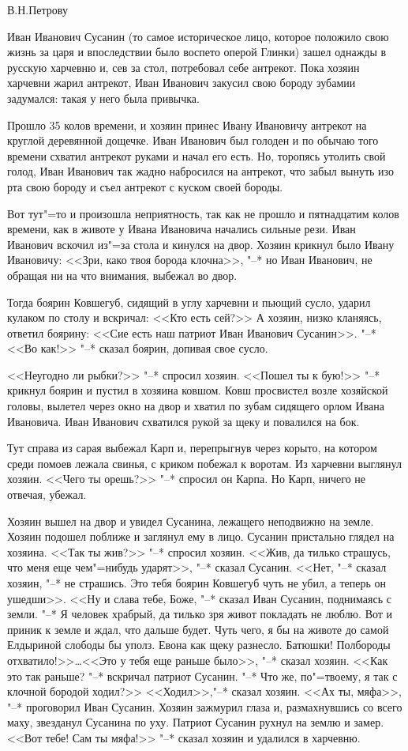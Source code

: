 \begin{flushright}
В.Н.Петрову
\end{flushright}

Иван Иванович Сусанин (то самое историческое лицо, которое положило свою жизнь за царя и впоследствии было воспето оперой Глинки) зашел однажды в русскую харчевню и, сев за стол, потребовал себе антрекот. Пока хозяин харчевни жарил антрекот, Иван Иванович закусил свою бороду зубамии задумался: такая у него была привычка. 

Прошло 35 колов времени, и хозяин принес Ивану Ивановичу антрекот на круглой деревянной дощечке. Иван Иванович был голоден и по обычаю того времени схватил антрекот руками и начал его есть. Но, торопясь утолить свой голод, Иван Иванович так жадно набросился на антрекот, что забыл вынуть изо рта свою бороду и съел антрекот с куском своей бороды. 

Вот тут"=то и произошла неприятность, так как не прошло и пятнадцатим колов времени, как в животе у Ивана Ивановича начались сильные рези. Иван Иванович вскочил из"=за стола и кинулся на двор. Хозяин крикнул было Ивану Ивановичу: <<Зри, како твоя борода клочна>>, "--* но Иван Иванович, не обращая ни на что внимания, выбежал во двор. 

Тогда боярин Ковшегуб, сидящий в углу харчевни и пьющий сусло, ударил кулаком по столу и вскричал: <<Кто есть сей?>> А хозяин, низко кланяясь, ответил боярину: <<Сие есть наш патриот Иван Иванович Сусанин>>. "--* <<Во как!>> "--* сказал боярин, допивая свое сусло. 

<<Неугодно ли рыбки?>> "--* спросил хозяин. <<Пошел ты к бую!>> "--* крикнул боярин и пустил в хозяина ковшом. Ковш просвистел возле хозяйской головы, вылетел через окно на двор и хватил по зубам сидящего орлом Ивана Ивановича. Иван Иванович схватился рукой за щеку и повалился на бок. 

Тут справа из сарая выбежал Карп и, перепрыгнув через корыто, на котором среди помоев лежала свинья, с криком побежал к воротам. Из харчевни выглянул хозяин. <<Чего ты орешь?>> "--* спросил он Карпа. Но Карп, ничего не отвечая, убежал. 

Хозяин вышел на двор и увидел Сусанина, лежащего неподвижно на земле. Хозяин подошел поближе и заглянул ему в лицо. Сусанин пристально глядел на хозяина. <<Так ты жив?>> "--* спросил хозяин. <<Жив, да тилько страшусь, что меня еще чем"=нибудь ударят>>, "--* сказал Сусанин. <<Нет, "--* сказал хозяин, "--* не страшись. Это тебя боярин Ковшегуб чуть не убил, а теперь он ушедши>>. <<Ну и слава тебе, Боже, "--* сказал Иван Сусанин, поднимаясь с земли. "--* Я человек храбрый, да тилько зря живот покладать не люблю. Вот и приник к земле и ждал, что дальше будет. Чуть чего, я бы на животе до самой Елдыриной слободы бы уполз. Евона как щеку разнесло. Батюшки! Полбороды отхватило!>>\dots <<Это у тебя еще раньше было>>, "--* сказал хозяин. <<Как это так раньше? "--* вскричал патриот Сусанин. "--* Что же, по"=твоему, я так с клочной бородой ходил?>> <<Ходил>>,"--* сказал хозяин. <<Ах ты, мяфа>>, "--* проговорил Иван Сусанин. Хозяин зажмурил глаза и, размахнувшись со всего маху, звезданул Сусанина по уху. Патриот Сусанин рухнул на землю и замер. <<Вот тебе! Сам ты мяфа!>> "--* сказал хозяин и удалился в харчевню. 

